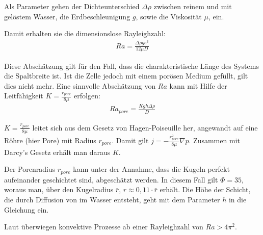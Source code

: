 Als Parameter gehen der Dichteunterschied $\Delta\rho$ zwischen reinem und mit \COT gelöstem Wasser, die Erdbeschleunigung $g$, sowie die Viskosität $\mu$, ein.

Damit erhalten sie die dimensionslose Rayleighzahl:
\begin{align}
 Ra = \frac{\Delta\rho g e^3}{12 \mu D}
 \label{eq:Ra1}
\end{align}


Diese Abschätzung gilt für den Fall, dass die charakteristische Länge des Systems die Spaltbreite ist. Ist die Zelle jedoch mit einem porösen Medium gefüllt, gilt dies nicht mehr.
Eine sinnvolle Abschätzung von $Ra$ kann mit Hilfe der Leitfähigkeit $K = \frac{r_{pore}}{8\mu}$ erfolgen:
\begin{align}
 Ra_{pore} = \frac{K g h \Delta \rho}{D}
 \label{eq:Ra2}
\end{align}

$K = \frac{r_{pore}}{8\mu}$ leitet sich aus dem Gesetz von Hagen-Poiseuille her, angewandt auf eine Röhre (hier Pore) mit Radius $r_{pore}$. Damit gilt $j = -\frac{r_{pore}^2}{8\mu} \nabla p$. Zusammen mit Darcy's Gesetz erhält man daraus $K$.

Der Porenradius $r_{pore}$ kann unter der Annahme, dass die Kugeln perfekt aufeinander geschichtet sind, abgeschätzt werden. In diesem Fall gilt $\Phi=35$, woraus man, über den Kugelradius $\bar{r}$, $r \approx 0,11 \cdot \bar{r}$ erhält.
Die Höhe der Schicht, die durch Diffusion von \COT im Wasser entsteht, geht mit dem Parameter $h$ in die Gleichung ein.

Laut \cite{kneafsy} überwiegen konvektive Prozesse ab einer Rayleighzahl von $Ra > 4\pi^2$. 